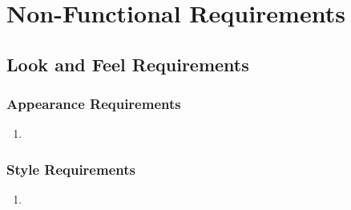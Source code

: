 \documentclass[]{article}
\begin{document}

\section{Non-Functional Requirements}
\label{sec:non-functional_requirements}


\subsection{Look and Feel Requirements}
\label{sub:look_and_feel_requirements}

\subsubsection{Appearance Requirements}
\label{ssub:appearance_requirements}
\begin{enumerate}[{LF-A}1. ]
	\item 
\end{enumerate}

\subsubsection{Style Requirements}
\label{ssub:style_requirements}
\begin{enumerate}[{LF-S}1. ]
	\item 
\end{enumerate}
\end{document}
